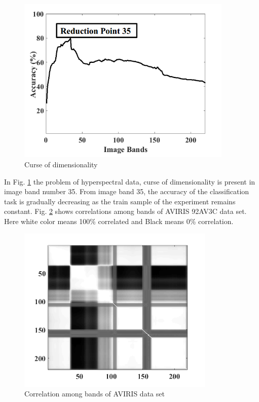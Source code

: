 \documentclass[document.tex]{subfiles}
\begin{document}
\begin{figure}[H]
\begin{center}
	\includegraphics[height=8.0cm]{imgs/curse.png}
\end{center}
\caption{Curse of dimensionality\cite{9}}
\label{fig:Curse of dimensionality}
\end{figure}
\noindent In Fig. \ref{fig:Curse of dimensionality} the problem of hyperspectral data, curse of dimensionality is present in image band number 35. From image band 35, the accuracy of the classification task is gradually decreasing as the train sample of the experiment remains constant. Fig. \ref{fig:Correlation among bands of AVIRIS data set} shows correlations among bands of AVIRIS 92AV3C data set. Here white color means 100\% correlated and Black means 0\% correlation.
\begin{figure}[H]
	\begin{center}
		\includegraphics[height=8.0cm]{imgs/corr.png}
	\end{center}
	\caption{Correlation among bands of AVIRIS data set}
	\label{fig:Correlation among bands of AVIRIS data set}
\end{figure}
\end{document}

